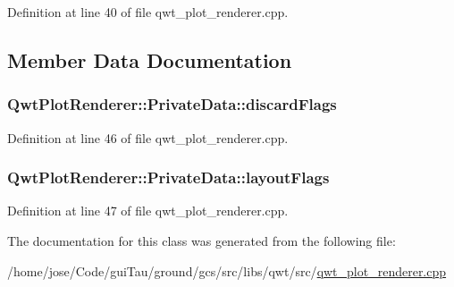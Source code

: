 Definition at line 40 of file qwt\-\_\-plot\-\_\-renderer.\-cpp.



\subsection{Member Data Documentation}
\hypertarget{class_qwt_plot_renderer_1_1_private_data_a6d7e457560ec7979b6386c54b490941d}{
\subsubsection[{discard\-Flags}]{ Qwt\-Plot\-Renderer\-::\-Private\-Data\-::discard\-Flags}}\label{class_qwt_plot_renderer_1_1_private_data_a6d7e457560ec7979b6386c54b490941d}


Definition at line 46 of file qwt\-\_\-plot\-\_\-renderer.\-cpp.

\hypertarget{class_qwt_plot_renderer_1_1_private_data_a774279c3de874b338bd38ed78f05cfc8}{
\subsubsection[{layout\-Flags}]{ Qwt\-Plot\-Renderer\-::\-Private\-Data\-::layout\-Flags}}\label{class_qwt_plot_renderer_1_1_private_data_a774279c3de874b338bd38ed78f05cfc8}


Definition at line 47 of file qwt\-\_\-plot\-\_\-renderer.\-cpp.



The documentation for this class was generated from the following file\-:\begin{DoxyCompactItemize}
\item 
/home/jose/\-Code/gui\-Tau/ground/gcs/src/libs/qwt/src/\hyperlink{qwt__plot__renderer_8cpp}{qwt\-\_\-plot\-\_\-renderer.\-cpp}\end{DoxyCompactItemize}
